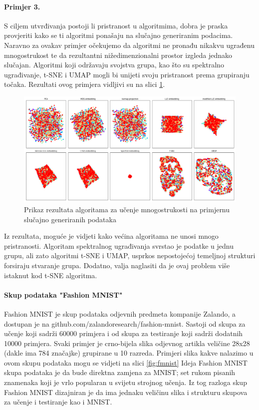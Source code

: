 \documentclass[times, utf8, diplomski]{fer}
\begin{document}
\paragraph{Primjer 3.}
S ciljem utvrđivanja postoji li pristranost u algoritmima, dobra je praska provjeriti kako se ti algoritmi ponašaju na slučajno generiranim podacima. Naravno za ovakav primjer očekujemo da algoritmi ne pronađu nikakvu ugrađenu mnogostrukost te da rezultantni nižedimenzionalni prostor izgleda jednako slučajan. Algoritmi koji održavaju svojstva grupa, kao što su spektralno ugrađivanje, t-SNE i UMAP mogli bi unijeti svoju pristranost prema grupiranju točaka. Rezultati ovog primjera vidljivi su na slici \ref{fig:xr}.

\begin{figure}[htb]
    \centering
    \includegraphics[width=\textwidth]{resources/images/reduction/compare/xr.png}
    \caption{Prikaz rezultata algoritama za učenje mnogostrukosti na primjernu slučajno generiranih podataka}
    \label{fig:xr}
\end{figure}

Iz rezultata, moguće je vidjeti kako većina algoritama ne unosi mnogo pristranosti. Algoritam spektralnog ugrađivanja svrstao je podatke u jednu grupu, ali zato algoritmi t-SNE i UMAP, usprkos nepostojećoj temeljnoj strukturi forsiraju stvaranje grupa. Dodatno, valja naglasiti da je ovaj problem više istaknut kod t-SNE algoritma.

\paragraph{Skup podataka "Fashion MNIST"}

Fashion MNIST je skup podataka odjevnih predmeta kompanije Zalando, a dostupan je na github.com/zalandoresearch/fashion-mnist. Sastoji od skupa za učenje koji sadrži 60000 primjera i od skupa za testiranje koji sadrži dodatnih 10000 primjera. Svaki primjer je crno-bijela slika odjevnog artikla veličine 28x28 (dakle ima 784 značajke) grupirane u 10 razreda. Primjeri slika kakve nalazimo u ovom skupu podataka mogu se vidjeti na slici \ref{fig:fmnist} Ideja Fashion MNIST skupa podataka je da bude direktna zamjena za MNIST; set rukom pisanih znamenaka koji je vrlo popularan u svijetu strojnog učenja. Iz tog razloga skup Fashion MNIST dizajniran je da ima jednaku veličinu slika i strukturu skupova za učenje i testiranje kao i MNIST.
\end{document}
